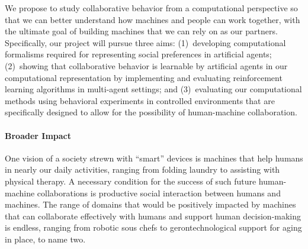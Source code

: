
We propose to study collaborative behavior from a computational perspective so
that we can better understand how machines and people can work
together, with the ultimate goal of building machines that we can rely
on as our partners. Specifically, our project will pursue three aims:
%
(1)~developing computational formalisms required for representing
social preferences in artificial agents; (2)~showing that
collaborative behavior is learnable by artificial agents in our
computational representation by implementing and evaluating
reinforcement learning algorithms in multi-agent settings; and
(3)~evaluating our computational methods using behavioral experiments
in controlled environments that are specifically designed to allow for
the possibility of human-machine collaboration.



\vspace{\up}
\paragraph{Broader Impact}

One vision of a society strewn with ``smart'' devices is
machines that help humans in nearly our daily activities, 
ranging from folding laundry to assisting with physical therapy.
A necessary condition for the success of such future human-machine collaborations 
is productive social interaction between humans and machines.  
%
The range of domains that would be positively impacted by machines
that can collaborate effectively with humans and support human
decision-making is endless, ranging from robotic sous chefs to
gerontechnological support for aging in place, to name two.


